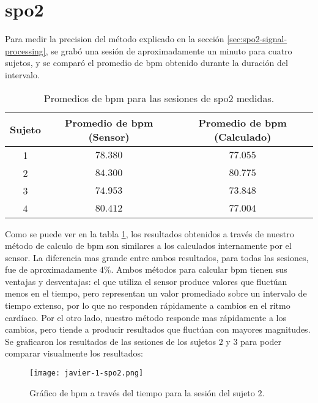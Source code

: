 \section{\acrshort{spo2}}

Para medir la precision del método explicado en la sección \ref{sec:spo2-signal-processing}, se grabó una sesión de aproximadamente un minuto para cuatro sujetos, y se comparó el promedio de \acrshort{bpm} obtenido durante la duración del intervalo.

\begin{table}[H]
\centering
\begin{tabular}{ |c|c|c| } 
 \hline
 Sujeto & Promedio de \acrshort{bpm} (Sensor) & Promedio de \acrshort{bpm} (Calculado) \\ 
 \hline
 1 & $78.380$ & $77.055$ \\
 \hline
 2 & $84.300$ & $80.775$ \\
 \hline
 3 & $74.953$ & $73.848$ \\
 \hline
 4 & $80.412$ & $77.004$ \\

 \hline
\end{tabular}
\caption{Promedios de \acrshort{bpm} para las sesiones de \acrshort{spo2} medidas.}
\label{tab:spo2-results}
\end{table}

Como se puede ver en la tabla \ref{tab:spo2-results}, los resultados obtenidos a través de nuestro método de calculo de \acrshort{bpm} son similares a los calculados internamente por el sensor. La diferencia mas grande entre ambos resultados, para todas las sesiones, fue de aproximadamente $4\%$. Ambos métodos para calcular \acrshort{bpm} tienen sus ventajas y desventajas: el que utiliza el sensor produce valores que fluctúan menos en el tiempo, pero representan un valor promediado sobre un intervalo de tiempo extenso, por lo que no responden rápidamente a cambios en el ritmo cardíaco. Por el otro lado, nuestro método responde mas rápidamente a los cambios, pero tiende a producir resultados que fluctúan con mayores magnitudes. Se graficaron los resultados de las sesiones de los sujetos $2$ y $3$ para poder comparar visualmente los resultados:

\begin{figure}[H]
	\centering
    \texttt{[image: javier-1-spo2.png]}
    \caption{Gráfico de \acrshort{bpm} a través del tiempo para la sesión del sujeto $2$.}
	\label{fig:spo2-graph-2}
\end{figure}

